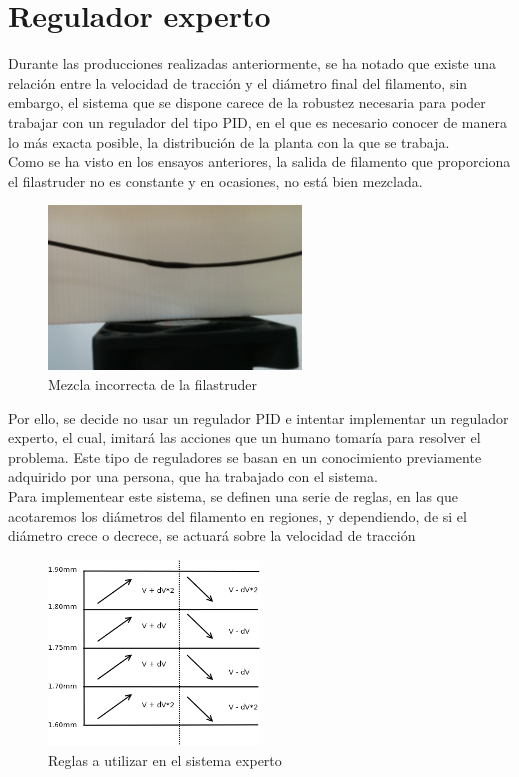 \section{Regulador experto}
\label{sec:reg_expt}

Durante las producciones realizadas anteriormente, se ha notado que existe una relación entre la velocidad de tracción y el diámetro final del filamento, sin embargo, el sistema que se dispone carece de la robustez necesaria para poder trabajar con un regulador del tipo PID, en el que es necesario conocer de manera lo más exacta posible, la distribución de la planta con la que se trabaja.\\

Como se ha visto en los ensayos anteriores, la salida de filamento que proporciona el filastruder no es constante y en ocasiones, no está bien mezclada.

\begin{figure}[H]
    \centering
    \includegraphics[width=0.6\textwidth]{images/producciones/22072015/IMG_20150722_120959.jpg}
    \caption{Mezcla incorrecta de la filastruder}
    \label{fig:reg_mezcla}
\end{figure}

Por ello, se decide no usar un regulador PID e intentar implementar un regulador experto, el cual, imitará las acciones que un humano tomaría para resolver el problema. Este tipo de reguladores se basan en un conocimiento previamente adquirido por una persona, que ha trabajado con el sistema.\\

Para implementear este sistema, se definen una serie de reglas, en las que acotaremos los diámetros del filamento en regiones, y dependiendo, de si el diámetro crece o decrece, se actuará sobre la velocidad de tracción
\begin{figure}[H]
    \centering
    \includegraphics[width=0.5\textwidth]{images/producciones/11082015/Diagram1.png}
    \caption{Reglas a utilizar en el sistema experto}
    \label{fig:reg_reglas}
\end{figure}

